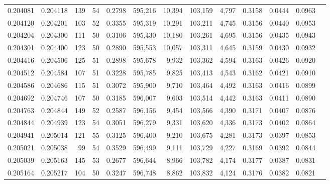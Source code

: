 \begin{tabular}{rrrrrrrrrrrrr}
0.204081 & 0.204118 &   139 &  54 &                                     0.2798 & 595,216 &  10,394 & 103,159 &   4,797 & 0.3158 & 0.0444 & 0.0963 \\
0.204120 & 0.204201 &   103 &  52 &                                     0.3355 & 595,319 &  10,291 & 103,211 &   4,745 & 0.3156 & 0.0440 & 0.0953 \\
0.204204 & 0.204300 &   111 &  50 &                                     0.3106 & 595,430 &  10,180 & 103,261 &   4,695 & 0.3156 & 0.0435 & 0.0943 \\
0.204301 & 0.204400 &   123 &  50 &                                     0.2890 & 595,553 &  10,057 & 103,311 &   4,645 & 0.3159 & 0.0430 & 0.0932 \\
0.204416 & 0.204506 &   125 &  51 &                                     0.2898 & 595,678 &   9,932 & 103,362 &   4,594 & 0.3163 & 0.0426 & 0.0920 \\
0.204512 & 0.204584 &   107 &  51 &                                     0.3228 & 595,785 &   9,825 & 103,413 &   4,543 & 0.3162 & 0.0421 & 0.0910 \\
0.204586 & 0.204686 &   115 &  51 &                                     0.3072 & 595,900 &   9,710 & 103,464 &   4,492 & 0.3163 & 0.0416 & 0.0899 \\
0.204692 & 0.204746 &   107 &  50 &                                     0.3185 & 596,007 &   9,603 & 103,514 &   4,442 & 0.3163 & 0.0411 & 0.0890 \\
0.204763 & 0.204844 &   149 &  52 &                                     0.2587 & 596,156 &   9,454 & 103,566 &   4,390 & 0.3171 & 0.0407 & 0.0876 \\
0.204844 & 0.204939 &   123 &  54 &                                     0.3051 & 596,279 &   9,331 & 103,620 &   4,336 & 0.3173 & 0.0402 & 0.0864 \\
0.204941 & 0.205014 &   121 &  55 &                                     0.3125 & 596,400 &   9,210 & 103,675 &   4,281 & 0.3173 & 0.0397 & 0.0853 \\
0.205021 & 0.205038 &    99 &  54 &                                     0.3529 & 596,499 &   9,111 & 103,729 &   4,227 & 0.3169 & 0.0392 & 0.0844 \\
0.205039 & 0.205163 &   145 &  53 &                                     0.2677 & 596,644 &   8,966 & 103,782 &   4,174 & 0.3177 & 0.0387 & 0.0831 \\
0.205164 & 0.205217 &   104 &  50 &                                     0.3247 & 596,748 &   8,862 & 103,832 &   4,124 & 0.3176 & 0.0382 & 0.0821 \\

\end{tabular}
